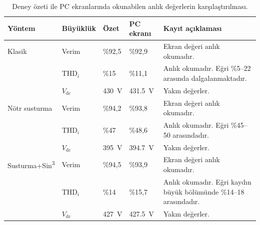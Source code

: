 \begin{table}[H]
  \centering
  \caption{Deney özeti ile PC ekranlarında okunabilen anlık değerlerin karşılaştırılması.}
  \label{tab:deney-metin-ekran-karsilastirma}
  \footnotesize
  \begin{tabularx}{\textwidth}{L{0.19\textwidth} L{0.10\textwidth} *{2}{>{\centering\arraybackslash}p{0.10\textwidth}} >{\teksatir\raggedright\arraybackslash}X}
    \toprule
    Yöntem & Büyüklük & Özet & PC ekranı & Kayıt açıklaması \\
    \midrule
    Klasik & Verim & \%92,5 & \%92,9 & Ekran değeri anlık okumadır. \\
    & THD$_i$ & \%15 & \%11,1 & Anlık okumadır. Eğri \%5--22 arasında dalgalanmaktadır. \\
    & $V_{\mathrm{dc}}$ & \SI{430}{\volt} & \SI{431.5}{\volt} & Yakın değerler. \\
    \midrule
    Nötr susturma & Verim & \%94,2 & \%93,8 & Ekran değeri anlık okumadır. \\
    & THD$_i$ & \%47 & \%48,6 & Anlık okumadır. Eğri \%45--50 arasındadır. \\
    & $V_{\mathrm{dc}}$ & \SI{395}{\volt} & \SI{394.7}{\volt} & Yakın değerler. \\
    \midrule
    Susturma+Sin\textsuperscript{3} & Verim & \%94,5 & \%93,9 & Ekran değeri anlık okumadır. \\
    & THD$_i$ & \%14 & \%15,7 & Anlık okumadır. Eğri kaydın büyük bölümünde \%14--18 arasındadır. \\
    & $V_{\mathrm{dc}}$ & \SI{427}{\volt} & \SI{427.5}{\volt} & Yakın değerler. \\
    \bottomrule
  \end{tabularx}
\end{table}

